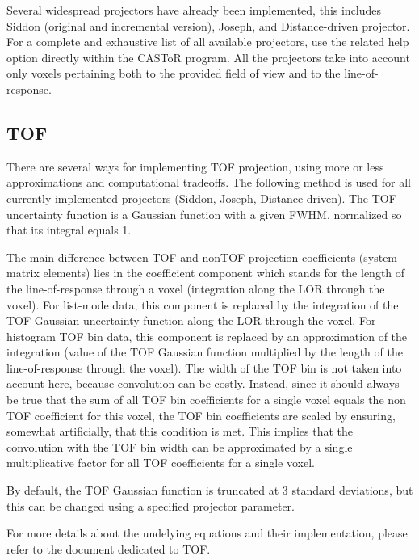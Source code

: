 \documentclass[a4paper, 11pt]{article}
\begin{document}
Several widespread projectors have already been implemented, this includes Siddon (original and incremental version), Joseph, and Distance-driven projector.
For a complete and exhaustive list of all available projectors, use the related help option directly within the CASToR program.
All the projectors take into account only voxels pertaining both to the provided field of view and to the line-of-response.

\subsection{TOF}

There are several ways for implementing TOF projection, using more or less approximations and computational tradeoffs.
The following method is used for all currently implemented projectors (Siddon, Joseph, Distance-driven).
The TOF uncertainty function is a Gaussian function with a given FWHM, normalized so that its integral equals 1.

The main difference between TOF and nonTOF projection coefficients (system matrix elements) lies in the coefficient component which stands for the length of the 
line-of-response through a voxel (integration along the LOR through the voxel). For list-mode data, this component is replaced by the integration of the TOF Gaussian
 uncertainty function along the LOR through the voxel. For histogram TOF bin data, this component is replaced by an approximation of the integration 
(value of the TOF Gaussian function multiplied by the length of the line-of-response through the voxel). The width of the TOF bin is not taken into account here, 
because convolution can be costly.
Instead, since it should always be true that the sum of all TOF bin coefficients for a single voxel equals the non TOF coefficient for this voxel, the TOF bin
 coefficients are scaled by ensuring, somewhat artificially, that this condition is met. This implies that the convolution with the TOF bin width can be approximated 
by a single multiplicative factor for all TOF coefficients for a single voxel.

By default, the TOF Gaussian function is truncated at 3 standard deviations, but this can be changed using a specified projector parameter.

For more details about the undelying equations and their implementation, please refer to the document dedicated to TOF. 

\end{document}
